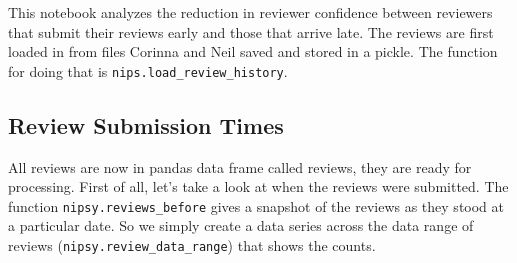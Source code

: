 \begin{flushright}
\end{flushright}

This notebook analyzes the reduction in reviewer confidence between
reviewers that submit their reviews early and those that arrive late.
The reviews are first loaded in from files Corinna and Neil saved and
stored in a pickle. The function for doing that is
\texttt{nips.load\_review\_history}.

\begin{Shaded}
\begin{Highlighting}[]

\end{Highlighting}
\end{Shaded}

\begin{Shaded}
\begin{Highlighting}[]
\OperatorTok{=}
\end{Highlighting}
\end{Shaded}

\hypertarget{review-submission-times}{%
\subsection{Review Submission Times}\label{review-submission-times}}

All reviews are now in pandas data frame called reviews, they are ready
for processing. First of all, let's take a look at when the reviews were
submitted. The function \texttt{nipsy.reviews\_before} gives a snapshot
of the reviews as they stood at a particular date. So we simply create a
data series across the data range of reviews
(\texttt{nipsy.review\_data\_range}) that shows the counts.

\begin{Shaded}
\begin{Highlighting}[]
\OperatorTok{=}\OperatorTok{=}
\OperatorTok{=}\NormalTok{ nipsy.reviews\_before(reviews, date).Quality.shape[}\NormalTok{]}
\end{Highlighting}
\end{Shaded}

